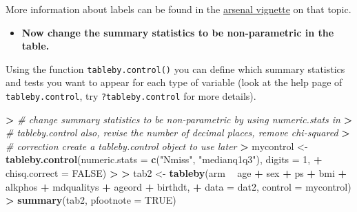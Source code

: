 \documentclass[
]{book}
\newenvironment{Shaded}{\begin{snugshade}}{\end{snugshade}}
\newcommand{\CommentTok}[1]{\textcolor[rgb]{0.56,0.35,0.01}{\textit{#1}}}
\newcommand{\DataTypeTok}[1]{\textcolor[rgb]{0.13,0.29,0.53}{#1}}
\newcommand{\DecValTok}[1]{\textcolor[rgb]{0.00,0.00,0.81}{#1}}
\newcommand{\ErrorTok}[1]{\textcolor[rgb]{0.64,0.00,0.00}{\textbf{#1}}}
\newcommand{\KeywordTok}[1]{\textcolor[rgb]{0.13,0.29,0.53}{\textbf{#1}}}
\newcommand{\NormalTok}[1]{#1}
\newcommand{\OperatorTok}[1]{\textcolor[rgb]{0.81,0.36,0.00}{\textbf{#1}}}
\newcommand{\OtherTok}[1]{\textcolor[rgb]{0.56,0.35,0.01}{#1}}
\newcommand{\StringTok}[1]{\textcolor[rgb]{0.31,0.60,0.02}{#1}}
\providecommand{\tightlist}{%
  \setlength{\itemsep}{0pt}\setlength{\parskip}{0pt}}
\begin{document}
More information about labels can be found in the \href{https://cran.r-project.org/web/packages/arsenal/vignettes/labels.html}{arsenal vignette} on that topic.

\begin{itemize}
\tightlist
\item
  \textbf{Now change the summary statistics to be non-parametric in the table.}
\end{itemize}

Using the function \texttt{tableby.control()} you can define which summary statistics and tests you want to appear for each type of variable (look at the help page of \texttt{tableby.control}, try \texttt{?tableby.control} for more details).

\begin{Shaded}
\begin{Highlighting}[]
\OperatorTok{>}\StringTok{ }\CommentTok{# change summary statistics to be non-parametric by using numeric.stats in}
\ErrorTok{>}\StringTok{ }\CommentTok{# tableby.control also, revise the number of decimal places, remove chi-squared}
\ErrorTok{>}\StringTok{ }\CommentTok{# correction create a tableby.control object to use later}
\ErrorTok{>}\StringTok{ }\NormalTok{mycontrol <-}\StringTok{ }\KeywordTok{tableby.control}\NormalTok{(}\DataTypeTok{numeric.stats =} \KeywordTok{c}\NormalTok{(}\StringTok{"Nmiss"}\NormalTok{, }\StringTok{"medianq1q3"}\NormalTok{), }\DataTypeTok{digits =} \DecValTok{1}\NormalTok{, }
\OperatorTok{+}\StringTok{     }\DataTypeTok{chisq.correct =} \OtherTok{FALSE}\NormalTok{)}
\OperatorTok{>}\StringTok{ }
\ErrorTok{>}\StringTok{ }\NormalTok{tab2 <-}\StringTok{ }\KeywordTok{tableby}\NormalTok{(arm }\OperatorTok{~}\StringTok{ }\NormalTok{age }\OperatorTok{+}\StringTok{ }\NormalTok{sex }\OperatorTok{+}\StringTok{ }\NormalTok{ps }\OperatorTok{+}\StringTok{ }\NormalTok{bmi }\OperatorTok{+}\StringTok{ }\NormalTok{alkphos }\OperatorTok{+}\StringTok{ }\NormalTok{mdqualitys }\OperatorTok{+}\StringTok{ }\NormalTok{ageord }\OperatorTok{+}\StringTok{ }\NormalTok{birthdt, }
\OperatorTok{+}\StringTok{     }\DataTypeTok{data =}\NormalTok{ dat2, }\DataTypeTok{control =}\NormalTok{ mycontrol)}
\OperatorTok{>}\StringTok{ }\KeywordTok{summary}\NormalTok{(tab2, }\DataTypeTok{pfootnote =} \OtherTok{TRUE}\NormalTok{)}
\end{Highlighting}
\end{Shaded}
\end{document}
